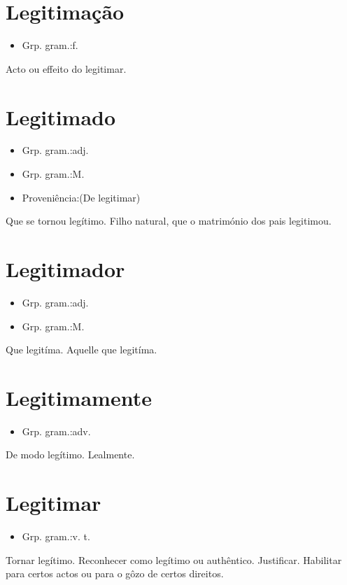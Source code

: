 \section{Legitimação}
\begin{itemize}
\item {Grp. gram.:f.}
\end{itemize}
Acto ou effeito do legitimar.
\section{Legitimado}
\begin{itemize}
\item {Grp. gram.:adj.}
\end{itemize}
\begin{itemize}
\item {Grp. gram.:M.}
\end{itemize}
\begin{itemize}
\item {Proveniência:(De \textunderscore legitimar\textunderscore )}
\end{itemize}
Que se tornou legítimo.
Filho natural, que o matrimónio dos pais legitimou.
\section{Legitimador}
\begin{itemize}
\item {Grp. gram.:adj.}
\end{itemize}
\begin{itemize}
\item {Grp. gram.:M.}
\end{itemize}
Que legitíma.
Aquelle que legitíma.
\section{Legitimamente}
\begin{itemize}
\item {Grp. gram.:adv.}
\end{itemize}
De modo legítimo.
Lealmente.
\section{Legitimar}
\begin{itemize}
\item {Grp. gram.:v. t.}
\end{itemize}
Tornar legítimo.
Reconhecer como legítimo ou authêntico.
Justificar.
Habilitar para certos actos ou para o gôzo de certos direitos.

